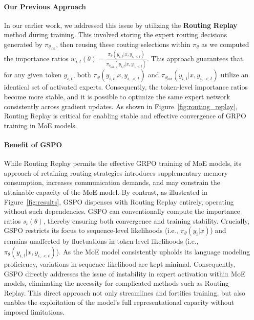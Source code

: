 \paragraph{Our Previous Approach} In our earlier work, we addressed this issue by utilizing the \textbf{Routing Replay} method during training. This involved storing the expert routing decisions generated by $\pi_{\theta_\text{old}}$, then reusing these routing selections within $\pi_{\theta}$ as we computed the importance ratios $w_{i,t}(\theta) = \frac{ \pi_{\theta} (y_{i,t} | x, y_{i,<t}) }{ \pi_{\theta_\text{old}} (y_{i,t} | x,y_{i,<t})}$. This approach guarantees that, for any given token $y_{i,t}$, both $\pi_{\theta} (y_{i,t} | x, y_{i,<t})$ and $\pi_{\theta_\text{old}} (y_{i,t} | x,y_{i,<t})$ utilize an identical set of activated experts. Consequently, the token-level importance ratios become more stable, and it is possible to optimize the same expert network consistently across gradient updates. As shown in Figure~\ref{fig:routing_replay}, Routing Replay is critical for enabling stable and effective convergence of GRPO training in MoE models.

\paragraph{Benefit of GSPO} While Routing Replay permits the effective GRPO training of MoE models, its approach of retaining routing strategies introduces supplementary memory consumption, increases communication demands, and may constrain the attainable capacity of the MoE model. By contrast, as illustrated in Figure~\ref{fig:results}, GSPO dispenses with Routing Replay entirely, operating without such dependencies. GSPO can conventionally compute the importance ratios $s_i(\theta)$, thereby ensuring both convergence and training stability. Crucially, GSPO restricts its focus to sequence-level likelihoods (i.e., $\pi_{\theta} (y_i | x)$) and remains unaffected by fluctuations in token-level likelihoods (i.e., $\pi_{\theta} (y_{i,t} | x, y_{i,<t})$). As the MoE model consistently upholds its language modeling proficiency, variations in sequence likelihood are kept minimal. Consequently, GSPO directly addresses the issue of instability in expert activation within MoE models, eliminating the necessity for complicated methods such as Routing Replay. This direct approach not only streamlines and fortifies training, but also enables the exploitation of the model’s full representational capacity without imposed limitations.

